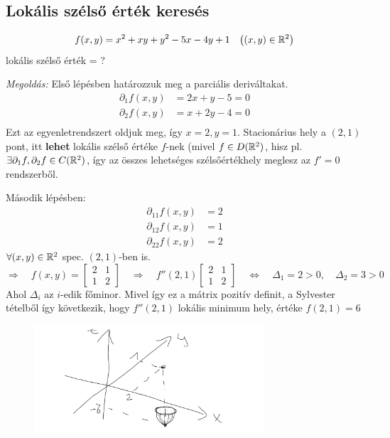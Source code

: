 \documentclass[a4paper,11.5pt]{article}
\begin{document}
	\subsection{Lokális szélső érték keresés}
	\begin{example}
		\[ f(x,y)=x^2+xy+y^2-5x-4y+1\quad \big((x,y)\in\mathbb{R}^2\big) \]
		lokális szélső érték = ?
		
		\textit{Megoldás:} Első lépésben határozzuk meg a parciális deriváltakat.
		\begin{align*}
			\partial_1f(x,y)&=2x+y-5 = 0\\
			\partial_2f(x,y)&=x+2y-4=0\\
		\end{align*}
		Ezt az egyenletrendszert oldjuk meg, így $x=2, y=1$. Stacionárius hely a $(2,1)$ pont, itt \textbf{lehet} lokális szélső értéke $f$-nek (mivel $f\in D(\mathbb{R}^2)$, hisz pl. $\exists \partial_1f,\partial_2f\in C(\mathbb{R}^2)$, így az összes lehetséges szélsőértékhely meglesz az $f'=0$ rendszerből.
		
		Második lépésben: 
		\begin{align*}
			\partial_{11}f(x,y)&=2 \\
			\partial_{12}f(x,y)&=1 \\
			\partial_{22}f(x,y)&=2 
		\end{align*} 
		$\forall(x,y)\in\mathbb{R}^2$ spec. $(2,1)$-ben is.
		\[ \Rightarrow\quad f(x,y)=\begin{bmatrix}
			2&1\\
			1&2
		\end{bmatrix}\quad \Rightarrow\quad f''(2,1)\begin{bmatrix}
			2&1\\
			1&2
		\end{bmatrix}\quad \Leftrightarrow\quad \varDelta_1=2>0,\quad \varDelta_2=3>0 \]
		Ahol $\varDelta_i$ az $i$-edik főminor. Mivel így ez a mátrix pozitív definit, a Sylvester tételből így következik, hogy $f''(2,1)$ lokális minimum hely, értéke $f(2,1)=6$
		\begin{figure}[H]
			\centering
			\includegraphics[height=4cm]{kepek/38.png}
			\caption{}
		\end{figure}
	\end{example}
\end{document}

